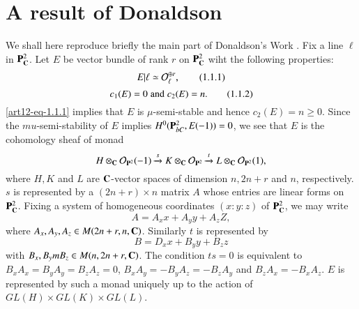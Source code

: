 \section{A result of Donaldson}\label{art12-sec-1}
\pageoriginale
We shall here reproduce briefly the main part of Donaldson's Work \cite{art12-key1}. Fix a line $\ell$ in $\mathbf{P}_{\mathbf{C}}^{2}$. Let $E$ be vector bundle of rank $r$ on $\mathbf{P}_{\mathbf{C}}^{2}$ wiht the following properties:
\begin{equation*}
E|\ell \simeq \mathcal{O}_{\ell}^{\oplus r},\tag{1.1.1} \label{art12-eq-1.1.1}
\end{equation*}
\begin{equation*}
c_{1} (E) =0 \;{\rm and}\; c_{2}(E) =n.\tag{1.1.2}\label{art12-eq-1.1.2}
\end{equation*}
\eqref{art12-eq-1.1.1} implies that $E$ is $\mu$-semi-stable and hence $c_{2}(E)= n \geq 0$. Since the $mu$-semi-stability of $E$ implies $H^{0}(\mathbf{P}_{bC}^{2}, E(-1))=0$, we see that $E$ is the cohomology sheaf of monad
$$
H\otimes_{\mathbf{C}} \mathcal{O}_{\mathbf{P}^{2}}(-1)\xrightarrow{s} K \otimes_{\mathbf{C}} \mathcal{O}_{\mathbf{P}^{2}} \xrightarrow{t} L \otimes_{\mathbf{C}} \mathcal{O}_{\mathbf{P}^{2}}(1),
$$
where $H, K$ and $L$ are $\mathbf{C}$-vector spaces of dimension $n,2n +r$ and $n$, respectively. $s$ is represented by a $(2n +r)\times n$ matrix $A$ whose entries are linear forms on $\mathbf{P}_{\mathbf{C}}^{2}$. Fixing a system of homogeneous coordinates
$(x : y : z)$ of $\mathbf{P}_{\mathbf{C}}^{2}$, we may write
$$
A =A_{x}x + A_{y}y +A_{z}Z,
$$
where $A_{x}, A_{y}, A_{z} \in M(2n + r, n, \mathbf{C})$. Similarly $t$ is represented by
$$
B =D_{x}x +B_{y}y +B_{z}z
$$
with $B_{x}, B_{y}m B_{z} \in M(n, 2n + r, \mathbf{C})$. The condition $ts =0$ is equivalent to $B_{x}A_{x}=B_{y}A_{y} = B_{z}A_{z}=0$, $B_{x}A_{y} = -B_{y}A_{z} = -B_{z}A_{y}$ and $B_{z}A_{x} = -B_{x}A_{z}$. $E$ is represented by such a monad uniquely up to the action of $GL(H) \times GL(K) \times GL(L)$.

